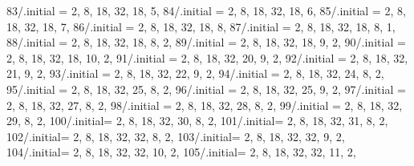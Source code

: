 {    83/.initial = {2, 8, 18, 32, 18, 5},  %
    84/.initial = {2, 8, 18, 32, 18, 6},  %
    85/.initial = {2, 8, 18, 32, 18, 7},  %
    86/.initial = {2, 8, 18, 32, 18, 8},  %
    87/.initial = {2, 8, 18, 32, 18,  8, 1},  %
    88/.initial = {2, 8, 18, 32, 18,  8, 2},  %
    89/.initial = {2, 8, 18, 32, 18,  9, 2},  %
    90/.initial = {2, 8, 18, 32, 18, 10, 2},  %
    91/.initial = {2, 8, 18, 32, 20,  9, 2},  %
    92/.initial = {2, 8, 18, 32, 21,  9, 2},  %
    93/.initial = {2, 8, 18, 32, 22,  9, 2},  %
    94/.initial = {2, 8, 18, 32, 24,  8, 2},  %
    95/.initial = {2, 8, 18, 32, 25,  8, 2},  %
    96/.initial = {2, 8, 18, 32, 25,  9, 2},  %
    97/.initial = {2, 8, 18, 32, 27,  8, 2},  %
    98/.initial = {2, 8, 18, 32, 28,  8, 2},  %
    99/.initial = {2, 8, 18, 32, 29,  8, 2},  %
    100/.initial= {2, 8, 18, 32, 30,  8, 2},  %
    101/.initial= {2, 8, 18, 32, 31,  8, 2},  %
    102/.initial= {2, 8, 18, 32, 32,  8, 2},  %
    103/.initial= {2, 8, 18, 32, 32,  9, 2},  %
    104/.initial= {2, 8, 18, 32, 32, 10, 2},  %
    105/.initial= {2, 8, 18, 32, 32, 11, 2},  %
}

